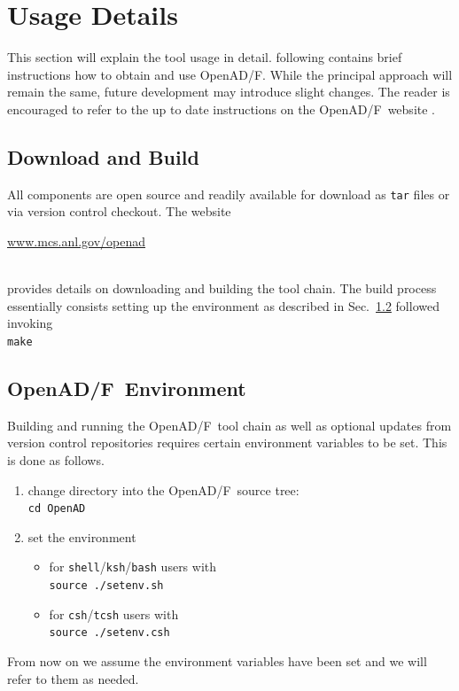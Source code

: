 \documentclass{book}
\newcommand{\OpenADF}{OpenAD/F}
\newcommand{\refsec}[1]{{Sec.~\ref{#1}}}
\begin{document}
\chapter{Usage Details} \label{sec:Usage}
This section will explain the tool usage in detail.  following contains brief instructions how to obtain and use \OpenADF. 
While the principal approach will remain the same, future development may 
introduce slight changes. The reader is encouraged to refer to the 
up to date instructions on the \OpenADF\ website \cite{openadWeb}.

\section{Download and Build}\label{sec:dab}
All components are open source and readily available for download as \lstinline{tar} files
or via version control checkout. 
The website\\[1ex] 
\centerline{\url{www.mcs.anl.gov/openad}}\\[1ex]
provides details on downloading and building the tool chain. 
The build process essentially consists setting up the environment as described in 
\refsec{sec:env} followed invoking\\[1ex]   
\hspace*{.3cm}\lstinline{make} \\[1ex] 

\section{\OpenADF\ Environment}\label{sec:env}
Building and running the \OpenADF\  tool chain as well as optional updates from 
version control repositories requires certain environment variables to be set. 
This is done as follows.
\begin{enumerate}
\item change directory into the \OpenADF\ source tree:\\
\lstinline{cd OpenAD}
\item set the environment 
\begin{itemize}
\item for \lstinline{shell}/\lstinline{ksh}/\lstinline{bash} users with\\
\lstinline{source ./setenv.sh}
\item for \lstinline{csh}/\lstinline{tcsh} users with\\
\lstinline{source ./setenv.csh}
\end{itemize}
\end{enumerate}
From now on we assume the environment variables have been set and we will refer 
to them as needed.  
\end{document}
